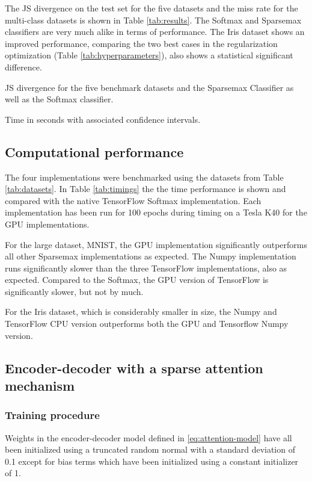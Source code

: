 The JS divergence on the test set for the five datasets and the miss rate for the multi-class datasets is shown in Table \ref{tab:results}. The Softmax and Sparsemax classifiers are very much alike in terms of performance. The Iris dataset shows an improved performance, comparing the two best cases in the regularization optimization (Table \ref{tab:hyperparameters}), also shows a statistical significant difference.

\begin{table}[H]
\centering

\caption{JS divergence for the five benchmark datasets and the Sparsemax Classifier as well as the Softmax classifier.}
\label{tab:results}
\end{table}

\begin{table}
\centering

\caption{Time in seconds with associated confidence intervals.}
\label{tab:timings}
\end{table}

\subsection{Computational performance}
The four implementations were benchmarked using the datasets from Table \ref{tab:datasets}. In Table \ref{tab:timings} the the time performance is shown and compared with the native TensorFlow Softmax implementation. Each implementation has been run for 100 epochs during timing on a Tesla K40 for the GPU implementations.

For the large dataset, MNIST, the GPU implementation significantly outperforms all other Sparsemax implementations as expected. The Numpy implementation runs significantly slower than the three TensorFlow implementations, also as expected. Compared to the Softmax, the GPU version of TensorFlow is significantly slower, but not by much.

For the Iris dataset, which is considerably smaller in size, the Numpy and TensorFlow CPU version outperforms both the GPU and Tensorflow Numpy version.

\subsection{Encoder-decoder with a sparse attention mechanism}
\subsubsection{Training procedure}
Weights in the encoder-decoder model defined in \eqref{eq:attention-model} have all been initialized using a truncated random normal with a standard deviation of 0.1 except for bias terms which have been initialized using a constant initializer of 1. 

